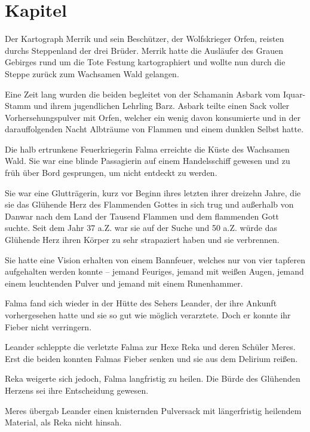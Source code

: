 \newpage
\section{Kapitel}

Der Kartograph Merrik und sein Beschützer, der Wolfskrieger Orfen, reisten durchs Steppenland der drei Brüder. Merrik hatte die Ausläufer des Grauen Gebirges rund um die Tote Festung kartographiert und wollte nun durch die Steppe zurück zum Wachsamen Wald gelangen.

Eine Zeit lang wurden die beiden begleitet von der Schamanin Asbark vom Iquar-Stamm und ihrem jugendlichen Lehrling Barz. Asbark teilte einen Sack voller Vorhersehungspulver mit Orfen, welcher ein wenig davon konsumierte und in der darauffolgenden Nacht Albträume von Flammen und einem dunklen Selbst hatte.


\trennzeichen


Die halb ertrunkene Feuerkriegerin Falma erreichte die Küste des Wachsamen Wald. Sie war eine blinde Passagierin auf einem Handelsschiff gewesen und zu früh über Bord gesprungen, um nicht entdeckt zu werden. 

Sie war eine Glutträgerin, kurz vor Beginn ihres letzten ihrer dreizehn Jahre, die sie das Glühende Herz des Flammenden Gottes in sich trug und außerhalb von Danwar nach dem Land der Tausend Flammen und dem flammenden Gott suchte. Seit dem Jahr 37 a.Z. war sie auf der Suche und 50 a.Z. würde das Glühende Herz ihren Körper zu sehr strapaziert haben und sie verbrennen.

Sie hatte eine Vision erhalten von einem Bannfeuer, welches nur von vier tapferen  aufgehalten werden konnte – jemand Feuriges, jemand mit weißen Augen, jemand einem leuchtenden Pulver und jemand mit einem Runenhammer.

Falma fand sich wieder in der Hütte des Sehers Leander, der ihre Ankunft vorhergesehen hatte und sie so gut wie möglich verarztete. Doch er konnte ihr Fieber nicht verringern.

Leander schleppte die verletzte Falma zur Hexe Reka und deren Schüler Meres. Erst die beiden konnten Falmas Fieber senken und sie aus dem Delirium reißen. 

Reka weigerte sich jedoch, Falma langfristig zu heilen. Die Bürde des Glühenden Herzens sei ihre Entscheidung gewesen. 

Meres übergab Leander einen knisternden Pulversack mit längerfristig heilendem Material, als Reka nicht hinsah.

